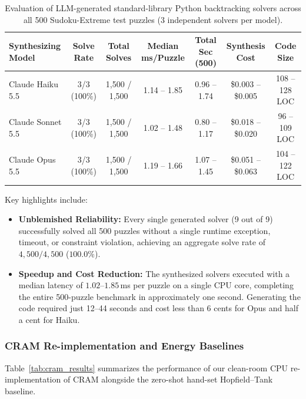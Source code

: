 \documentclass{article} %
\begin{document}
\begin{table}[ht]
\centering
\small
\caption{Evaluation of LLM-generated standard-library Python backtracking solvers across all 500 Sudoku-Extreme test puzzles (3 independent solvers per model).}
\label{tab:llm_coder}
\begin{tabular}{lcccccc}
\toprule
\textbf{Synthesizing Model} & \textbf{Solve Rate} & \textbf{Total Solves} & \textbf{Median ms/Puzzle} & \textbf{Total Sec (500)} & \textbf{Synthesis Cost} & \textbf{Code Size} \\
\midrule
Claude Haiku 5.5   & 3/3 (100\%) & 1,500 / 1,500 & 1.14 -- 1.85 & 0.96 -- 1.74 & \$0.003 -- \$0.005 & 108 -- 128 LOC \\
Claude Sonnet 5.5 & 3/3 (100\%) & 1,500 / 1,500 & 1.02 -- 1.48 & 0.80 -- 1.17 & \$0.018 -- \$0.020 & 96 -- 109 LOC \\
Claude Opus 5.5   & 3/3 (100\%) & 1,500 / 1,500 & 1.19 -- 1.66 & 1.07 -- 1.45 & \$0.051 -- \$0.063 & 104 -- 122 LOC \\
\bottomrule
\end{tabular}
\end{table}

Key highlights include:
\begin{itemize}
    \item \textbf{Unblemished Reliability:} Every single generated solver (9 out of 9) successfully solved all 500 puzzles without a single runtime exception, timeout, or constraint violation, achieving an aggregate solve rate of $4,500 / 4,500$ ($100.0\%$).
    \item \textbf{Speedup and Cost Reduction:} The synthesized solvers executed with a median latency of $1.02$--$1.85$\,ms per puzzle on a single CPU core, completing the entire 500-puzzle benchmark in approximately one second. Generating the code required just 12--44 seconds and cost less than 6 cents for Opus and half a cent for Haiku.
\end{itemize}

\subsubsection{CRAM Re-implementation and Energy Baselines}
Table~\ref{tab:cram_results} summarizes the performance of our clean-room CPU re-implementation of CRAM alongside the zero-shot hand-set Hopfield--Tank baseline.
\end{document}
